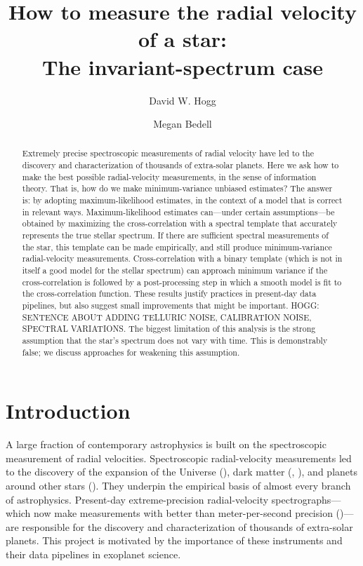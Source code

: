 \documentclass[modern]{aastex631}
\begin{document}
\title{How to measure the radial velocity of a star:\\The invariant-spectrum case}
\author[0000-0003-2866-9403]{David W. Hogg}

\author[0000-0001-9907-7742]{Megan Bedell}

\begin{abstract}\noindent
    Extremely precise spectroscopic measurements of radial velocity have led to the discovery and characterization of thousands of extra-solar planets.
    Here we ask how to make the best possible radial-velocity measurements, in the sense of information theory.
    That is, how do we make minimum-variance unbiased estimates?
    The answer is: by adopting maximum-likelihood estimates, in the context of a model that is correct in relevant ways.
    Maximum-likelihood estimates can---under certain assumptions---be obtained by maximizing the cross-correlation with a spectral template that accurately represents the true stellar spectrum.
    If there are sufficient spectral measurements of the star, this template can be made empirically, and still produce minimum-variance radial-velocity measurements.
    Cross-correlation with a binary template (which is not in itself a good model for the stellar spectrum) can approach minimum variance if the cross-correlation is followed by a post-processing step in which a smooth model is fit to the cross-correlation function.
    These results justify practices in present-day data pipelines, but also suggest small improvements that might be important.
    HOGG: SENTENCE ABOUT ADDING TELLURIC NOISE, CALIBRATION NOISE, SPECTRAL VARIATIONS.
    The biggest limitation of this analysis is the strong assumption that the star's spectrum does not vary with time.
    This is demonstrably false; we discuss approaches for weakening this assumption.
\end{abstract}


\section{Introduction}\label{sec:intro}

A large fraction of contemporary astrophysics is built on the spectroscopic measurement of radial velocities.
Spectroscopic radial-velocity measurements led to the discovery of the expansion of the Universe (\citealt{hubble}),
dark matter (\citealt{zwicky}, \citealt{rubin}),
and planets around other stars (\citealt{mayor}).
They underpin the empirical basis of almost every branch of astrophysics.
Present-day extreme-precision radial-velocity spectrographs---which now make measurements with better than meter-per-second precision (\citealt{what?})---are responsible for the discovery and characterization of thousands of extra-solar planets.
This project is motivated by the importance of these instruments and their data pipelines in exoplanet science.
\end{document}

